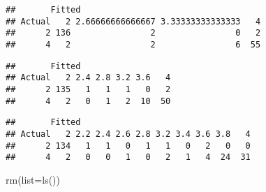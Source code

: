 \documentclass[
]{article}
\newenvironment{Shaded}{\begin{snugshade}}{\end{snugshade}}
\newcommand{\AttributeTok}[1]{\textcolor[rgb]{0.77,0.63,0.00}{#1}}
\newcommand{\DecValTok}[1]{\textcolor[rgb]{0.00,0.00,0.81}{#1}}
\newcommand{\FunctionTok}[1]{\textcolor[rgb]{0.00,0.00,0.00}{#1}}
\newcommand{\NormalTok}[1]{#1}
\newcommand{\OtherTok}[1]{\textcolor[rgb]{0.56,0.35,0.01}{#1}}
\newcommand{\SpecialCharTok}[1]{\textcolor[rgb]{0.00,0.00,0.00}{#1}}
\newcommand{\StringTok}[1]{\textcolor[rgb]{0.31,0.60,0.02}{#1}}
\begin{document}
\begin{verbatim}
##       Fitted
## Actual   2 2.66666666666667 3.33333333333333   4
##      2 136                2                0   2
##      4   2                2                6  55
\end{verbatim}

\begin{Shaded}
\end{Shaded}

\begin{verbatim}
##       Fitted
## Actual   2 2.4 2.8 3.2 3.6   4
##      2 135   1   1   1   0   2
##      4   2   0   1   2  10  50
\end{verbatim}

\begin{Shaded}
\end{Shaded}

\begin{verbatim}
##       Fitted
## Actual   2 2.2 2.4 2.6 2.8 3.2 3.4 3.6 3.8   4
##      2 134   1   1   0   1   1   0   2   0   0
##      4   2   0   0   1   0   2   1   4  24  31
\end{verbatim}

\begin{Shaded}
\begin{Highlighting}[]
\FunctionTok{rm}\NormalTok{(}\AttributeTok{list=}\FunctionTok{ls}\NormalTok{())}
\end{Highlighting}
\end{Shaded}
\end{document}
